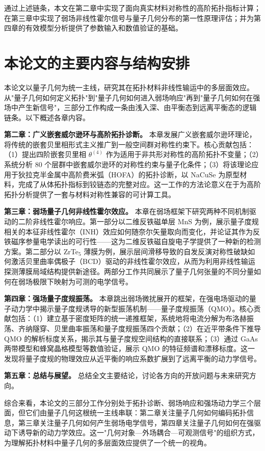 通过上述链条，本文在第二章中实现了面向真实材料对称性的高阶拓扑指标计算；在第三章中实现了弱场非线性霍尔信号与量子几何分布的第一性原理评估；并为第四章的有效模型分析提供了参数输入和数值验证的基础。


\section{本论文的主要内容与结构安排}
\label{sec:outline}

本论文以量子几何为统一主线，研究其在拓扑材料非线性输运中的多层面效应。从"量子几何如何定义拓扑"到"量子几何如何进入弱场响应"再到"量子几何如何在强场中产生新信号"，三部分工作构成一条由浅入深、由平衡态到远离平衡态的逻辑链条。以下概述各章内容。

\textbf{第二章：广义嵌套威尔逊环与高阶拓扑诊断。}
本章发展广义嵌套威尔逊环理论，将传统的嵌套贝里相形式主义推广到一般空间群对称性约束下。核心贡献包括：（1）提出四阶嵌套贝里相 $\theta^{(4)}$ 作为适用于非共形对称性的高阶拓扑不变量；（2）系统分析 80 个层群中嵌套威尔逊环的对称性约束与量子化条件；（3）将该理论应用于狄拉克半金属中高阶费米弧（HOFA）的拓扑诊断，以 NaCuSe 为原型材料，完成了从体拓扑指标到铰链态的完整对应。这一工作的方法论意义在于为高阶拓扑分析提供了一套与材料对称性兼容的可计算工具。

\textbf{第三章：弱场量子几何非线性霍尔效应。}
本章在弱场框架下研究两种不同机制驱动的二阶非线性霍尔响应。第一部分以二维反铁磁单层 MnS 为例，展示量子度规相关的本征非线性霍尔（INH）效应如何随奈尔矢量取向而变化，并论证其作为反铁磁序参量电学读出的可行性——这为二维反铁磁自旋电子学提供了一种新的检测方案。第二部分以 ZrTe$_5$ 薄膜为例，展示层间滑移导致的自发反演对称性破缺如何激活贝里曲率偶极子（BCD）驱动的非线性霍尔效应，从而为利用非线性输运探测薄膜局域结构提供新途径。两部分工作共同展示了量子几何张量的不同分量如何在弱场极限下映射为可测的电学信号。

\textbf{第四章：强场量子度规振荡。}
本章跳出弱场微扰展开的框架，在强电场驱动的量子动力学中揭示量子度规诱导的新型振荡机制——量子度规振荡（QMO）。核心贡献包括：（1）建立基于密度矩阵的统一递推框架，系统地将电流分解为布洛赫振荡、齐纳隧穿、贝里曲率振荡和量子度规振荡四个贡献；（2）在近平带条件下推导 QMO 的解析标度关系，揭示其与量子度规空间结构的直接联系；（3）通过 GaAs 两带模型和蜂窝晶格模型等数值验证，展示 QMO 的特征频谱和漂移标度。这一发现将量子度规的物理效应从近平衡的响应系数扩展到了远离平衡的动力学信号。

\textbf{第五章：总结与展望。}
总结全文主要结论，讨论各方向的开放问题与未来研究方向。

综合来看，本论文的三部分工作分别处于拓扑诊断、弱场响应和强场动力学三个层面，但它们由量子几何这根统一主线串联：第二章关注量子几何如何编码拓扑信息，第三章关注量子几何如何产生弱场电学信号，第四章关注量子几何如何在强驱动下诱导新的动力学效应。这一"几何对象—外场耦合—可观测信号"的组织方式，为理解拓扑材料中量子几何的多层面效应提供了一个统一的视角。
